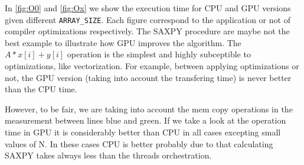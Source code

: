 \documentclass[12pt]{article}
\begin{document}
In \autoref{fig:O0} and \autoref{fig:Ox} we show the execution time for CPU and GPU versions given different \texttt{ARRAY\_SIZE}. Each figure correspond to the application or not of compiler optimizations respectively. The SAXPY procedure are maybe not the best example to illustrate how GPU improves the algorithm. The \texttt{$A*x[i] + y[i]$} operation is the simplest and highly subceptible to optimizations, like vectorization. For example, between applying optimizations or not, the GPU version (taking into account the transfering time) is never better than the CPU time. 

However, to be fair, we are taking into account the mem copy operations in the measurement between lines blue and green. If we take a look at the operation time in GPU it is considerably better than CPU in all cases excepting small values of N. In these cases CPU is better probably due to that calculating SAXPY takes always less than the threads orchestration. 
\end{document}
